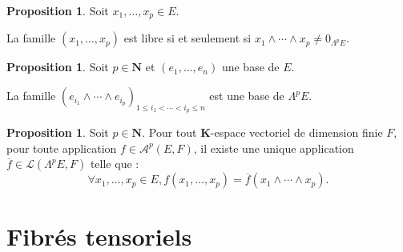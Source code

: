 \documentclass[12pt,a4paper]{article}
\theoremstyle{definition}
\newtheorem{prop}[thm]{Proposition}
\begin{document}
\begin{prop}
Soit $x_1,\ldots,x_p\in E$.

La famille $(x_1,\ldots,x_p)$ est libre si et seulement si $x_1\wedge\cdots\wedge x_p\neq 0_{\Lambda^pE}$.
\end{prop}
\begin{prop}
Soit $p\in\mathbf{N}$ et $(e_1,\ldots,e_n)$ une base de $E$.

La famille $\left(e_{i_1}\wedge\cdots\wedge e_{i_p}\right)_{1\leqslant i_1<\cdots<i_p\leqslant n}$ est une base de $\Lambda^pE$.
\end{prop}
\begin{prop}
Soit $p\in\mathbf{N}$. Pour tout $\mathbf{K}$-espace vectoriel de dimension finie $F$, pour toute application $f\in\mathcal{A}^p(E,F)$, il existe une unique application $\overline{f}\in\mathcal{L}(\Lambda^pE,F)$ telle que :
$$\forall x_1,\ldots,x_p\in E,f(x_1,\ldots,x_p)=\overline{f}(x_1\wedge\cdots\wedge x_p).$$
\end{prop}
\newpage
\section{Fibrés tensoriels}
\end{document}
